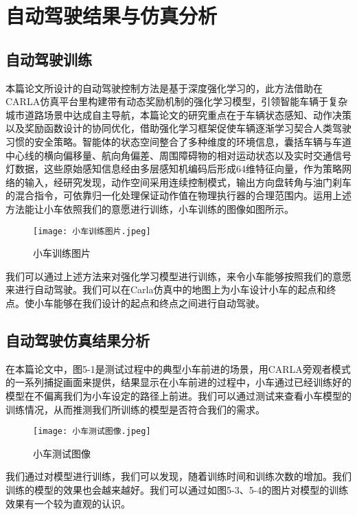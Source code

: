 \chapter{自动驾驶结果与仿真分析}

\section{自动驾驶训练}

本篇论文所设计的自动驾驶控制方法是基于深度强化学习的，此方法借助在CARLA仿真平台里构建带有动态奖励机制的强化学习模型，引领智能车辆于复杂城市道路场景中达成自主导航，本篇论文的研究重点在于车辆状态感知、动作决策以及奖励函数设计的协同优化，借助强化学习框架促使车辆逐渐学习契合人类驾驶习惯的安全策略。智能体的状态空间整合了多种维度的环境信息，囊括车辆与车道中心线的横向偏移量、航向角偏差、周围障碍物的相对运动状态以及实时交通信号灯数据，这些原始感知信息经由多层感知机编码后形成64维特征向量，作为策略网络的输入，经研究发现，动作空间采用连续控制模式，输出方向盘转角与油门刹车的混合指令，可依靠归一化处理保证动作值在物理执行器的合理范围内。运用上述方法能让小车依照我们的意愿进行训练，小车训练的图像如图所示。

\begin{figure}[hbt]
	\centering
	\texttt{[image: 小车训练图片.jpeg]}
	\caption{小车训练图片}
	\label{f.example}
\end{figure}

我们可以通过上述方法来对强化学习模型进行训练，来令小车能够按照我们的意愿来进行自动驾驶。我们可以在Carla仿真中的地图上为小车设计小车的起点和终点。使小车能够在我们设计的起点和终点之间进行自动驾驶。


\section{自动驾驶仿真结果分析}


在本篇论文中，图5-1是测试过程中的典型小车前进的场景，用CARLA旁观者模式的一系列捕捉画面来提供，结果显示在小车前进的过程中，小车通过已经训练好的模型在不偏离我们为小车设定的路径上前进。我们可以通过测试来查看小车模型的训练情况，从而推测我们所训练的模型是否符合我们的需求。

\begin{figure}[hbt]
	\centering
	\texttt{[image: 小车测试图像.jpeg]}
	\caption{小车测试图像}
	\label{f.example}
\end{figure}

我们通过对模型进行训练，我们可以发现，随着训练时间和训练次数的增加。我们训练的模型的效果也会越来越好。我们可以通过如图5-3、5-4的图片对模型的训练效果有一个较为直观的认识。

